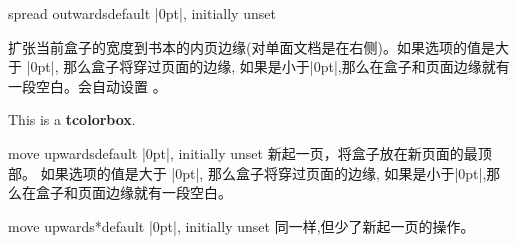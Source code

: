\begin{docTcbKey}[][doc new=2017-02-13]{spread outwards}{}{default |0pt|, initially unset}
  
  扩张当前盒子的宽度到书本的内页边缘(对单面文档是在右侧)。如果选项的值是大于 |0pt|, 那么盒子将穿过页面的边缘, 如果是小于|0pt|,那么在盒子和页面边缘就有一段空白。会自动设置  。
  
  \begin{dispListing}
  \begin{tcolorbox}[enhanced,spread outwards,
    colframe=blue!75!black,colback=white,show bounding box]
  This is a \textbf{tcolorbox}.
  \end{tcolorbox}
  \end{dispListing}
  {\tcbusetemp}
  \end{docTcbKey}


  \begin{docTcbKey}[][doc new=2017-02-13]{move upwards}{}{default |0pt|, initially unset}
    新起一页，将盒子放在新页面的最顶部。%
    如果选项的值是大于 |0pt|, 那么盒子将穿过页面的边缘, 如果是小于|0pt|,那么在盒子和页面边缘就有一段空白。
    \end{docTcbKey}
    
    
    \begin{docTcbKey}[][doc new=2017-02-13]{move upwards*}{}{default |0pt|, initially unset}
    同一样,但少了新起一页的操作。
    \end{docTcbKey}



